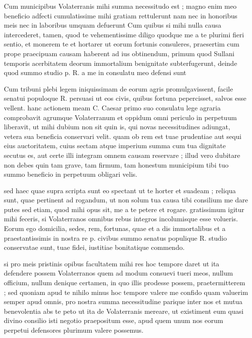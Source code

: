 


 Cum municipibus Volaterranis mihi summa necessitudo est ; magno enim meo beneficio adfecti cumulatissime mihi gratiam rettulerunt nam nec in honoribus meis nec in laboribus umquam defuerunt Cum quibus si mihi nulla causa intercederet, tamen, quod te vehementissime diligo quodque me a te plurimi fieri sentio, et monerem te et hortarer ut eorum fortunis consuleres, praesertim cum prope praecipuam causam haberent ad ius obtinendum, primum quod Sullani temporis acerbitatem deorum immortalium benignitate subterfugerunt, deinde quod summo studio p. R. a me in consulatu meo defensi sunt

 Cum tribuni plebi legem iniquissimam de eorum agris promulgavissent, facile senatui populoque R. persuasi ut eos civis, quibus fortuna pepercisset, salvos esse vellent. hanc actionem meam C. Caesar primo suo consulatu lege agraria comprobavit agrumque Volaterranum et oppidum omni periculo in perpetuum liberavit, ut mihi dubium non sit quin is, qui novas necessitudines adiungat, vetera sua beneficia conservari velit. quam ob rem est tuae prudentiae aut sequi eius auctoritatem, cuius sectam atque imperium summa cum tua dignitate secutus es, aut certe illi integram omnem causam reservare ; illud vero dubitare non debes quin tam grave, tam firmum, tam honestum municipium tibi tuo summo beneficio in perpetuum obligari velis.

 sed haec quae supra scripta sunt eo spectant ut te horter et suadeam ; reliqua sunt, quae pertinent ad rogandum, ut non solum tua causa tibi consilium me dare putes sed etiam, quod mihi opus sit, me a te petere et rogare. gratissimum igitur mihi feceris, si Volaterranos omnibus rebus integros incolumisque esse volueris. Eorum ego domicilia, sedes, rem, fortunas, quae et a dis immortalibus et a praestantissimis in nostra re p. civibus summo senatus populique R. studio conservatae sunt, tuae fidei, iustitiae bonitatique commendo.

 si pro meis pristinis opibus facultatem mihi res hoc tempore daret ut ita defendere possem Volaterranos quem ad modum consuevi tueri meos, nullum officium, nullum denique certamen, in quo illis prodesse possem, praetermitterem ; sed quoniam apud te nihilo minus hoc tempore valere me confido quam valuerim semper apud omnis, pro nostra summa necessitudine parique inter nos et mutua benevolentia abs te peto ut ita de Volaterranis mereare, ut existiment eum quasi divino consilio isti negotio praepositum esse, apud quem unum nos eorum perpetui defensores plurimum valere possemus.
